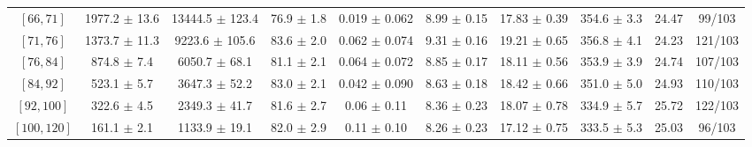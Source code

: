 \begin{tabular}{c||c|c|c|c|c|c|c||c|c}
$[66, 71]$ & 1977.2 $\pm$ 13.6 & 13444.5 $\pm$ 123.4 & 76.9 $\pm$ 1.8 & 0.019 $\pm$ 0.062 & 8.99 $\pm$ 0.15 & 17.83 $\pm$ 0.39 & 354.6 $\pm$ 3.3 & 24.47 & 99/103\\
$[71, 76]$ & 1373.7 $\pm$ 11.3 & 9223.6 $\pm$ 105.6 & 83.6 $\pm$ 2.0 & 0.062 $\pm$ 0.074 & 9.31 $\pm$ 0.16 & 19.21 $\pm$ 0.65 & 356.8 $\pm$ 4.1 & 24.23 & 121/103\\
$[76, 84]$ & 874.8 $\pm$ 7.4 & 6050.7 $\pm$ 68.1 & 81.1 $\pm$ 2.1 & 0.064 $\pm$ 0.072 & 8.85 $\pm$ 0.17 & 18.11 $\pm$ 0.56 & 353.9 $\pm$ 3.9 & 24.74 & 107/103\\
$[84, 92]$ & 523.1 $\pm$ 5.7 & 3647.3 $\pm$ 52.2 & 83.0 $\pm$ 2.1 & 0.042 $\pm$ 0.090 & 8.63 $\pm$ 0.18 & 18.42 $\pm$ 0.66 & 351.0 $\pm$ 5.0 & 24.93 & 110/103\\
$[92, 100]$ & 322.6 $\pm$ 4.5 & 2349.3 $\pm$ 41.7 & 81.6 $\pm$ 2.7 & 0.06 $\pm$ 0.11 & 8.36 $\pm$ 0.23 & 18.07 $\pm$ 0.78 & 334.9 $\pm$ 5.7 & 25.72 & 122/103\\
$[100, 120]$ & 161.1 $\pm$ 2.1 & 1133.9 $\pm$ 19.1 & 82.0 $\pm$ 2.9 & 0.11 $\pm$ 0.10 & 8.26 $\pm$ 0.23 & 17.12 $\pm$ 0.75 & 333.5 $\pm$ 5.3 & 25.03 & 96/103\\
\end{tabular}
